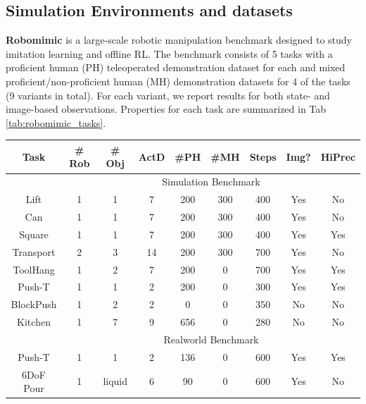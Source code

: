 \documentclass[Afour,sageh,times]{sagej}
\begin{document}
\subsection{Simulation Environments and datasets}
\textbf{Robomimic}
\cite{robomimic} is a large-scale robotic manipulation benchmark designed to study imitation learning and offline RL. The benchmark consists of 5 tasks with a proficient human (PH) teleoperated demonstration dataset for each and mixed proficient/non-proficient human (MH) demonstration datasets for 4 of the tasks (9 variants in total). For each variant, we report results for both state- and image-based observations. Properties for each task are summarized in Tab \ref{tab:robomimic_tasks}.

\begin{table}
\centering
\setlength\tabcolsep{2 pt}
\small
\begin{tabular}{c|cccccccc}
\toprule
Task      & \# Rob & \# Obj & ActD & \#PH & \#MH & Steps & Img? & HiPrec \\
\midrule
\multicolumn{1}{c}{} & \multicolumn{8}{c}{Simulation Benchmark} \\
\midrule
Lift      & 1      & 1      & 7    & 200   & 300   & 400       & Yes    & No       \\
Can       & 1      & 1      & 7    & 200   & 300   & 400       & Yes    & No       \\
Square    & 1      & 1      & 7    & 200   & 300   & 400       & Yes    & Yes      \\
Transport & 2      & 3      & 14   & 200   & 300   & 700       & Yes    & No       \\
ToolHang  & 1      & 2      & 7    & 200   & 0     & 700       & Yes    & Yes      \\
\midrule
Push-T    & 1      & 1      & 2    & 200   & 0     & 300       & Yes    & Yes      \\
\midrule
BlockPush & 1      & 2      & 2    & 0     & 0     & 350       & No     & No       \\
\midrule
Kitchen   & 1      & 7      & 9    & 656   & 0     & 280       & No     & No      \\
\midrule
\multicolumn{1}{c}{} & \multicolumn{8}{c}{Realworld Benchmark} \\
\midrule
Push-T    & 1      & 1      & 2    & 136   & 0     & 600       & Yes    & Yes  \\
6DoF Pour   & 1    & liquid      & 6    & 90   & 0     & 600       & Yes    & No  \\

\end{tabular}
\end{table}
\end{document}
